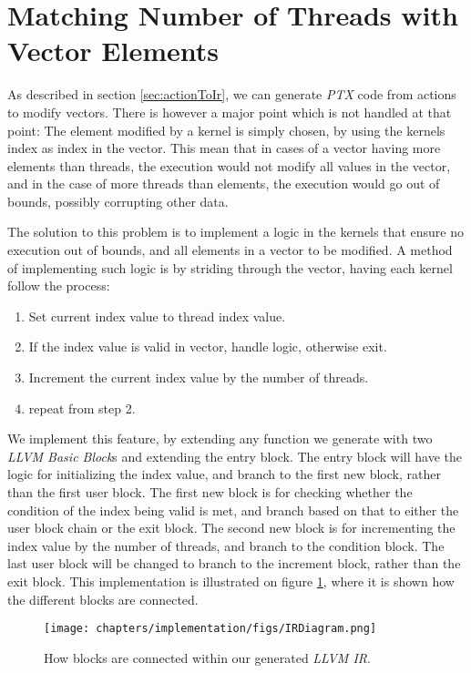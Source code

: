 \section{Matching Number of Threads with Vector Elements}
As described in section \ref{sec:actionToIr}, we can generate \textit{PTX} code from actions to modify vectors. There is however a major point which is not handled at that point: The element modified by a kernel is simply chosen, by using the kernels index as index in the vector. This mean that in cases of a vector having more elements than threads, the execution would not modify all values in the vector, and in the case of more threads than elements, the execution would go out of bounds, possibly corrupting other data.

The solution to this problem is to implement a logic in the kernels that ensure no execution out of bounds, and all elements in a vector to be modified. A method of implementing such logic is by striding through the vector, having each kernel follow the process:

\begin{enumerate}
\item Set current index value to thread index value.
\item If the index value is valid in vector, handle logic, otherwise exit.
\item Increment the current index value by the number of threads.
\item repeat from step 2.
\end{enumerate}

We implement this feature, by extending any function we generate with two \textit{LLVM Basic Block}s and extending the entry block. The entry block will have the logic for initializing the index value, and branch to the first new block, rather than the first user block. The first new block is for checking whether the condition of the index being valid is met, and branch based on that to either the user block chain or the exit block. The second new block is for incrementing the index value by the number of threads, and branch to the condition block. The last user block will be changed to branch to the increment block, rather than the exit block. This implementation is illustrated on figure \ref{blockFlowLoop}, where it is shown how the different blocks are connected.

\begin{figure}[!htb]
    \centering
    \texttt{[image: chapters/implementation/figs/IRDiagram.png]}
    \caption{How blocks are connected within our generated \textit{LLVM IR}.}
    \label{blockFlowLoop}
\end{figure}